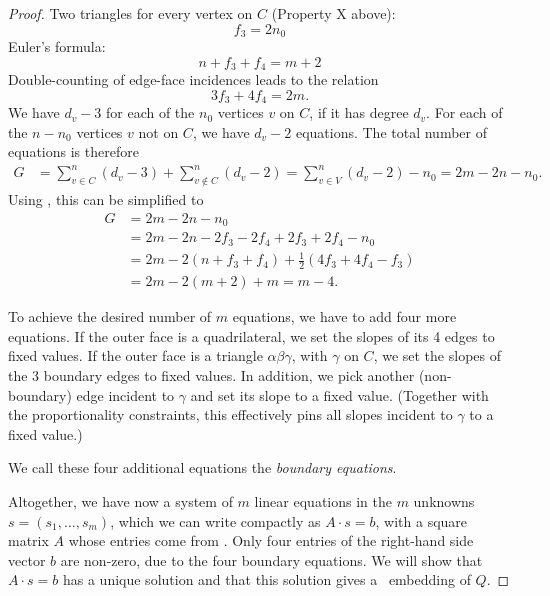 \begin{proof}
Two triangles for every vertex on $C$ (Property X above):
\begin{equation}
  \label{eq:f3}
  f_3 = 2n_0
\end{equation}
Euler's formula:
\begin{equation}
  \label{eq:Euler}
  n + f_3+f_4 = m+2
\end{equation}
Double-counting of edge-face incidences leads to the relation
\begin{equation}
  \label{eq:edge-face}
  3f_3+4f_4=2m.
\end{equation}
We have $d_v-3$ for each of the $n_0$ vertices $v$ on $C$, if it has
degree $d_v$. For each of the 
 $n-n_0$ vertices $v$ not on $C$, 
we have $d_v-2$ equations.
  The total number of equations is therefore
  \begin{align*}
G &= 
\sum_{v\in C}^n(d_v-3)+
\sum_{v\notin C}^n(d_v-2)
=
\sum_{v\in V}^n(d_v-2)-n_0
=
2m-2n-n_0.
  \end{align*}
Using \thetag{\ref{eq:f3}--\ref{eq:edge-face}}, this can be
simplified to
\begin{align*}
G&=
2m-2n-n_0\\
&= 2m -2n -2f_3-2f_4 +2f_3+2f_4-n_0\\
&= 2m -2(n +f_3+f_4) +\tfrac12(4f_3+4f_4-f_3)\\
&= 2m -2(m+2) +m = m-4.
\end{align*}

To achieve the desired number of $m$ equations, we have to add four
more equations.
If the outer face is a quadrilateral, we set the slopes of its
 4 edges
to fixed values.
If the outer face is a triangle $\alpha\beta\gamma$, with $\gamma$ on
$C$, we set the slopes of the 3 boundary edges
to fixed values. In addition, we pick another (non-boundary) edge
incident to $\gamma$ and set its slope to a fixed value.
(Together with the proportionality constraints, this effectively pins
all slopes
incident to $\gamma$ to a fixed value.)

We call these four additional equations the \emph{boundary equations}.

Altogether, we have now a system of $m$ linear equations
in the $m$ unknowns $s=(s_1,\ldots,s_m)$, which we can write
compactly as
 $A\cdot s = b$, with a square matrix $A$ whose entries come from
 \thetag{\ref{eq:slope0}--\ref{eq:proportion2}}.
Only four entries of
the right-hand side vector
 $b$
are non-zero, due to the four boundary equations.
We will show that $A\cdot s=b$ has a unique
solution and that this solution gives a \Fary\ embedding of $Q$.


\end{proof}
